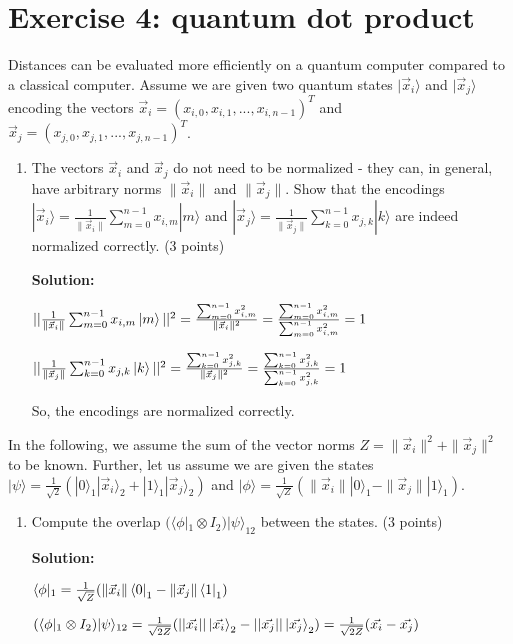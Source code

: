 \documentclass[12pt]{article}
\begin{document}
\section{Exercise 4: quantum dot product}

Distances can be evaluated more efficiently on a quantum computer compared to a classical computer. Assume we are given two quantum states $|\vec{x}_i\rangle$ and $|\vec{x}_j\rangle$ encoding the vectors $\vec{x}_i = (x_{i,0}, x_{i,1}, ..., x_{i,n-1})^T$ and $\vec{x}_j = (x_{j,0}, x_{j,1}, ..., x_{j,n-1})^T$.
\begin{enumerate}
    \item The vectors $\vec{x}_i$ and $\vec{x}_j$ do not need to be normalized - they can, in general, have arbitrary norms $\|\vec{x}_i\|$ and $\|\vec{x}_j\|$. Show that the encodings 
    $|\vec{x}_i\rangle = \frac{1}{\|\vec{x}_i\|} \sum_{m=0}^{n-1} x_{i,m}|m\rangle$ 
    and $|\vec{x}_j\rangle = \frac{1}{\|\vec{x}_j\|} \sum_{k=0}^{n-1} x_{j,k}|k\rangle$ are indeed normalized correctly. (3 points)
    
    \textbf{Solution:}

    $||\frac{1}{\|\vec{x}_i\|} \sum_{m=0}^{n-1} x_{i,m}\ket{m}||^2=
    \frac{\sum_{m=0}^{n-1}x_{i,m}^2}{\|\vec{x}_i\|^2}=
    \frac{\sum_{m=0}^{n-1}x_{i,m}^2}{\sum_{m=0}^{n-1}x_{i,m}^2}=1
    $ 

    $||\frac{1}{\|\vec{x}_j\|} \sum_{k=0}^{n-1} x_{j,k}\ket{k}||^2=
    \frac{\sum_{k=0}^{n-1}x_{j,k}^2}{\|\vec{x}_j\|^2}=
    \frac{\sum_{k=0}^{n-1}x_{j,k}^2}{\sum_{k=0}^{n-1}x_{j,k}^2}=1
    $ 

    So, the encodings are normalized correctly.
\end{enumerate}


In the following, we assume the sum of the vector norms $Z = \|\vec{x}_i\|^2 + \|\vec{x}_j\|^2$ to be known. Further, let us assume we are given the states $|\psi\rangle = \frac{1}{\sqrt{2}}(|0\rangle_1|\vec{x}_i\rangle_2 + |1\rangle_1|\vec{x}_j\rangle_2)$ and $|\phi\rangle = \frac{1}{\sqrt{Z}}(\|\vec{x}_i\||0\rangle_1 - \|\vec{x}_j\||1\rangle_1)$.

\begin{enumerate}[start=2]
    \item Compute the overlap $(\langle\phi|_1 \otimes I_2)|\psi\rangle_{12}$ between the states. (3 points)
    

    \textbf{Solution:}

    $\langle\phi|_1=\frac{1}{\sqrt{Z}}(\|\vec{x}_i\|\bra{0}_1 - \|\vec{x}_j\|\bra{1}_1)$
    
    $(\langle\phi|_1 \otimes I_2)|\psi\rangle_{12}
    \\=\frac{1}{\sqrt{2Z}}(||\vec{x_i}||\ket{\vec{x_i}}_2-||\vec{x_j}||\ket{\vec{x_j}}_2)
    \\=\frac{1}{\sqrt{2Z}}(\vec{x_i}-\vec{x_j})
    $

\end{enumerate}
\end{document}
